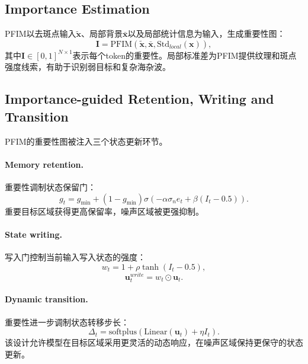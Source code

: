 \documentclass[UTF8,zihao=-4]{ctexart}
\begin{document}
\subsection{Importance Estimation}

PFIM以去斑点输入$\widetilde{\mathbf{x}}$、局部背景$\bar{\mathbf{x}}$以及局部统计信息为输入，生成重要性图：
\begin{equation}
  \mathbf{I} = \mathrm{PFIM}(\widetilde{\mathbf{x}}, \bar{\mathbf{x}}, \mathrm{Std}_{local}(\mathbf{x})),
\end{equation}
其中$\mathbf{I}\in[0,1]^{N\times 1}$表示每个token的重要性。局部标准差为PFIM提供纹理和斑点强度线索，有助于识别弱目标和复杂海杂波。

\subsection{Importance-guided Retention, Writing and Transition}

PFIM的重要性图被注入三个状态更新环节。

\paragraph{Memory retention.}
重要性调制状态保留门：
\begin{equation}
  g_t = g_{\min} + (1-g_{\min})
  \sigma(-\alpha\sigma_n e_t + \beta(I_t-0.5)).
\end{equation}
重要目标区域获得更高保留率，噪声区域被更强抑制。

\paragraph{State writing.}
写入门控制当前输入写入状态的强度：
\begin{equation}
  w_t = 1 + \rho \tanh(I_t-0.5),
\end{equation}
\begin{equation}
  \mathbf{u}^{write}_t = w_t \odot \mathbf{u}_t.
\end{equation}

\paragraph{Dynamic transition.}
重要性进一步调制状态转移步长：
\begin{equation}
  \Delta_t = \mathrm{softplus}(\mathrm{Linear}(\mathbf{u}_t) + \eta I_t).
\end{equation}
该设计允许模型在目标区域采用更灵活的动态响应，在噪声区域保持更保守的状态更新。
\end{document}
